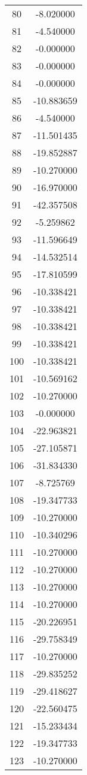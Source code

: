 \documentclass[12pt]{article}
\begin{document}
\begin{longtable}{@{}cc@{}}
80 & -8.020000 \\
81 & -4.540000 \\
82 & -0.000000 \\
83 & -0.000000 \\
84 & -0.000000 \\
85 & -10.883659 \\
86 & -4.540000 \\
87 & -11.501435 \\
88 & -19.852887 \\
89 & -10.270000 \\
90 & -16.970000 \\
91 & -42.357508 \\
92 & -5.259862 \\
93 & -11.596649 \\
94 & -14.532514 \\
95 & -17.810599 \\
96 & -10.338421 \\
97 & -10.338421 \\
98 & -10.338421 \\
99 & -10.338421 \\
100 & -10.338421 \\
101 & -10.569162 \\
102 & -10.270000 \\
103 & -0.000000 \\
104 & -22.963821 \\
105 & -27.105871 \\
106 & -31.834330 \\
107 & -8.725769 \\
108 & -19.347733 \\
109 & -10.270000 \\
110 & -10.340296 \\
111 & -10.270000 \\
112 & -10.270000 \\
113 & -10.270000 \\
114 & -10.270000 \\
115 & -20.226951 \\
116 & -29.758349 \\
117 & -10.270000 \\
118 & -29.835252 \\
119 & -29.418627 \\
120 & -22.560475 \\
121 & -15.233434 \\
122 & -19.347733 \\
123 & -10.270000 \\

\end{longtable}
\end{document}
